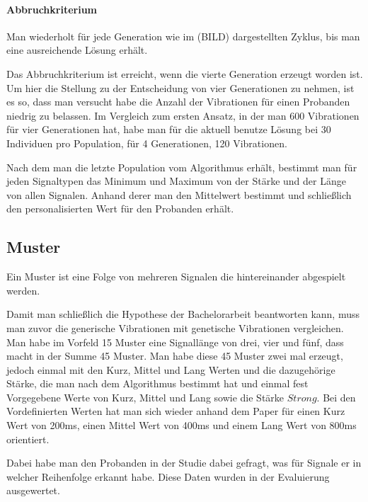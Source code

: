 \paragraph{Abbruchkriterium}
Man wiederholt f{\"u}r jede Generation wie im (BILD) dargestellten Zyklus, bis man eine ausreichende L{\"o}sung erh{\"a}lt.

Das Abbruchkriterium ist erreicht, wenn die vierte Generation erzeugt worden ist. Um hier die Stellung zu der Entscheidung von vier Generationen zu nehmen, ist es so, dass man versucht habe die Anzahl der Vibrationen f{\"u}r einen Probanden niedrig zu belassen. Im Vergleich zum ersten Ansatz, in der man 600 Vibrationen f{\"u}r vier Generationen hat, habe man f{\"u}r die aktuell benutze L{\"o}sung bei 30 Individuen pro Population, f{\"u}r 4 Generationen, 120 Vibrationen. 

Nach dem man die letzte Population vom Algorithmus erh{\"a}lt, bestimmt man f{\"u}r jeden Signaltypen das Minimum und Maximum von der St{\"a}rke und der L{\"a}nge von allen Signalen. Anhand derer man den Mittelwert bestimmt und schlie{\ss}lich den personalisierten Wert f{\"u}r den Probanden erh{\"a}lt.

\subsection{Muster}
Ein Muster ist eine Folge von mehreren Signalen die hintereinander abgespielt werden. 

Damit man schlie{\ss}lich die Hypothese der Bachelorarbeit beantworten kann, muss man zuvor die generische Vibrationen mit genetische Vibrationen vergleichen. Man habe im Vorfeld 15 Muster eine Signall{\"a}nge von drei, vier und f{\"u}nf, dass macht in der Summe 45 Muster.
Man habe diese 45 Muster zwei mal erzeugt, jedoch einmal mit den Kurz, Mittel und Lang Werten und die dazugeh{\"o}rige St{\"a}rke, die man nach dem Algorithmus bestimmt hat und einmal fest Vorgegebene Werte von Kurz, Mittel und Lang sowie die St{\"a}rke $Strong$. Bei den Vordefinierten Werten hat man sich wieder anhand dem Paper \cite{pescara2016ruttelflug} f{\"u}r einen Kurz Wert von 200ms, einen Mittel Wert von 400ms und einem Lang Wert von 800ms orientiert.

Dabei habe man den Probanden in der Studie dabei gefragt, was f{\"u}r Signale er in welcher Reihenfolge erkannt habe. Diese Daten wurden in der Evaluierung ausgewertet.